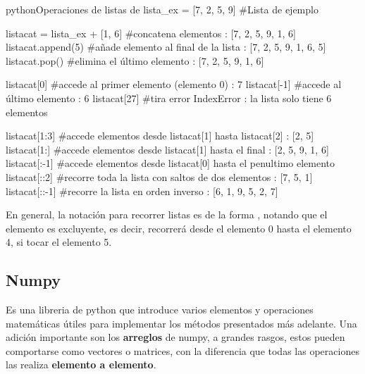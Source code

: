  \begin{sourcecode}[\label{sc:lists}]{python}{Operaciones de listas de }
    lista_ex = [7, 2, 5, 9] #Lista de ejemplo

    listacat = lista_ex + [1, 6] #concatena elementos  : [7, 2, 5, 9, 1, 6]
    listacat.append(5) #añade elemento al final de la lista : [7, 2, 5, 9, 1, 6, 5]
    listacat.pop() #elimina el último elemento  : [7, 2, 5, 9, 1, 6]

    listacat[0]  #accede al primer elemento (elemento 0) : 7
    listacat[-1] #accede al último elemento  : 6
    listacat[27] #tira error IndexError  : la lista solo tiene 6 elementos
    
    listacat[1:3] #accede elementos desde listacat[1] hasta listacat[2] : [2, 5]
    listacat[1:] #accede elementos desde listacat[1] hasta el final : [2, 5, 9, 1, 6]
    listacat[:-1] #accede elementos desde listacat[0] hasta el penultimo elemento 
    listacat[::2] #recorre toda la lista con saltos de dos elementos  : [7, 5, 1]
    listacat[::-1] #recorre la lista en orden inverso : [6, 1, 9, 5, 2, 7]
  \end{sourcecode}

  En general, la notación para recorrer listas es de la forma , notando que el elemento  es excluyente, es decir,  recorrerá desde el elemento 0 hasta el elemento 4, si tocar el elemento 5.

  \subsection{Numpy}%

   Es una libreria de python que introduce varios elementos y operaciones matemáticas útiles para implementar los métodos presentados más adelante. Una adición importante son los \textbf{arreglos} de numpy, a grandes rasgos, estos pueden comportarse como vectores o matrices, con la diferencia que todas las operaciones las realiza \textbf{elemento a elemento}.

